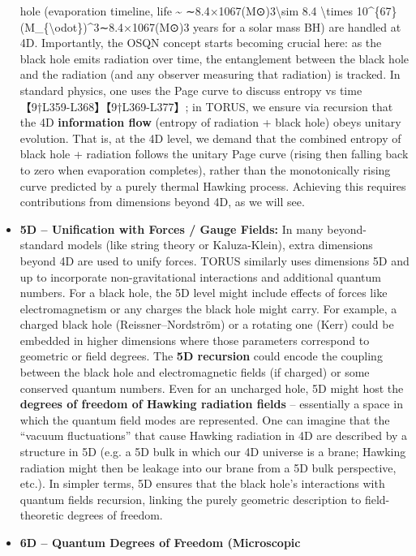 \documentclass[]{article}
\begin{document}
\begin{itemize}
  hole (evaporation timeline, life \textasciitilde{}
  ∼8.4×1067(M⊙)3\textbackslash{}sim 8.4 \textbackslash{}times
  10\^{}\{67\}(M\_\{\textbackslash{}odot\})\^{}3∼8.4×1067(M⊙​)3 years
  for a solar mass BH) are handled at 4D. Importantly, the OSQN concept
  starts becoming crucial here: as the black hole emits radiation over
  time, the entanglement between the black hole and the radiation (and
  any observer measuring that radiation) is tracked. In standard
  physics, one uses the Page curve to discuss entropy vs
  time【9†L359-L368】【9†L369-L377】; in TORUS, we ensure via recursion
  that the 4D \textbf{information flow} (entropy of radiation + black
  hole) obeys unitary evolution. That is, at the 4D level, we demand
  that the combined entropy of black hole + radiation follows the
  unitary Page curve (rising then falling back to zero when evaporation
  completes), rather than the monotonically rising curve predicted by a
  purely thermal Hawking process. Achieving this requires contributions
  from dimensions beyond 4D, as we will see.
\item
  \textbf{5D -- Unification with Forces / Gauge Fields:} In many
  beyond-standard models (like string theory or Kaluza-Klein), extra
  dimensions beyond 4D are used to unify forces. TORUS similarly uses
  dimensions 5D and up to incorporate non-gravitational interactions and
  additional quantum numbers. For a black hole, the 5D level might
  include effects of forces like electromagnetism or any charges the
  black hole might carry. For example, a charged black hole
  (Reissner--Nordström) or a rotating one (Kerr) could be embedded in
  higher dimensions where those parameters correspond to geometric or
  field degrees. The \textbf{5D recursion} could encode the coupling
  between the black hole and electromagnetic fields (if charged) or some
  conserved quantum numbers. Even for an uncharged hole, 5D might host
  the \textbf{degrees of freedom of Hawking radiation fields} --
  essentially a space in which the quantum field modes are represented.
  One can imagine that the ``vacuum fluctuations'' that cause Hawking
  radiation in 4D are described by a structure in 5D (e.g. a 5D bulk in
  which our 4D universe is a brane; Hawking radiation might then be
  leakage into our brane from a 5D bulk perspective, etc.). In simpler
  terms, 5D ensures that the black hole's interactions with quantum
  fields recursion, linking the purely geometric description to
  field-theoretic degrees of freedom.
\item
  \textbf{6D -- Quantum Degrees of Freedom (Microscopic
}
\end{itemize}
\end{document}
